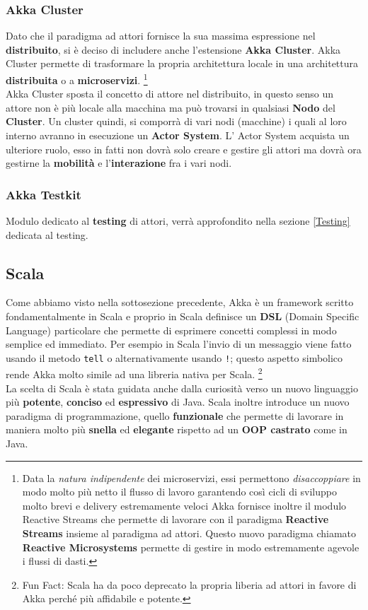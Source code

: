   \subsubsection{Akka Cluster}
  Dato che il paradigma ad attori fornisce la sua massima espressione nel \textbf{distribuito}, si è deciso di includere anche l'estensione \textbf{Akka Cluster}. Akka Cluster permette di trasformare la propria architettura locale in una architettura \textbf{distribuita} o a  \textbf{microservizi}.
  \footnote{ Data la \textit{natura indipendente} dei microservizi, essi permettono \textit{disaccoppiare} in modo molto più netto il flusso di lavoro garantendo così cicli di sviluppo molto brevi e delivery estremamente veloci Akka fornisce inoltre il modulo Reactive Streams che permette di lavorare con il paradigma \textbf{Reactive Streams} insieme al paradigma ad attori. Questo nuovo paradigma chiamato \textbf{Reactive Microsystems} permette di gestire in modo estremamente agevole i flussi di dasti.}\\
  Akka Cluster sposta il concetto di attore nel distribuito, in questo senso un attore non è più locale alla macchina ma può trovarsi in qualsiasi \textbf{Nodo} del \textbf{Cluster}. Un cluster quindi, si comporrà di vari nodi (macchine) i quali al loro interno avranno in esecuzione un \textbf{Actor System}. L' Actor System acquista un ulteriore ruolo, esso in fatti non dovrà solo creare e gestire gli attori ma dovrà ora gestirne la \textbf{mobilità} e l'\textbf{interazione} fra i vari nodi.
  \subsubsection{Akka Testkit}
  Modulo dedicato al \textbf{testing} di attori, verrà approfondito nella sezione \ref{Testing} dedicata al testing.

\subsection{Scala}
Come abbiamo visto nella sottosezione precedente, Akka è un framework scritto fondamentalmente in Scala e proprio in Scala definisce un \textbf{DSL} (Domain Specific Language) particolare che permette di esprimere concetti complessi in modo semplice ed immediato. Per esempio in Scala l'invio di un messaggio viene fatto usando il metodo \texttt{tell} o alternativamente usando \texttt{!}; questo aspetto simbolico rende Akka molto simile ad una libreria nativa per Scala.
\footnote{Fun Fact: Scala ha da poco deprecato la propria liberia ad attori in favore di Akka perché più affidabile e potente.}\\
La scelta di Scala è stata guidata anche dalla curiosità verso un nuovo linguaggio più \textbf{potente}, \textbf{conciso} ed \textbf{espressivo} di Java. Scala inoltre introduce un nuovo paradigma di programmazione, quello \textbf{funzionale} che permette di lavorare in maniera molto più \textbf{snella} ed \textbf{elegante} rispetto ad un \textbf{OOP castrato} come in Java.


